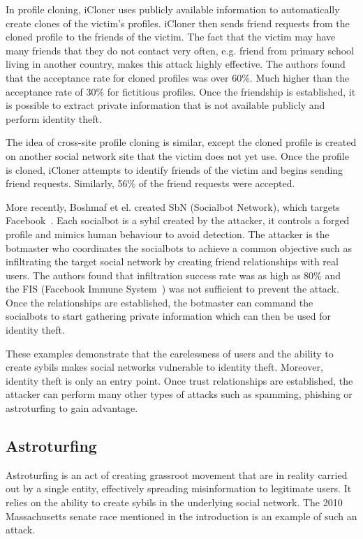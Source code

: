In profile cloning, iCloner uses publicly available information to automatically
create clones of the victim's profiles. iCloner then sends friend requests from
the cloned profile to the friends of the victim. The fact that the victim may
have many friends that they do not contact very often, e.g. friend from primary
school living in another country, makes this attack highly effective. The
authors found that the acceptance rate for cloned profiles was over 60\%. Much
higher than the acceptance rate of 30\% for fictitious profiles. Once the
friendship is established, it is possible to extract private information that is
not available publicly and perform identity theft.

The idea of cross-site profile cloning is similar, except the cloned profile is
created on another social network site that the victim does not yet use. Once
the profile is cloned, iCloner attempts to identify friends of the
victim and begins sending friend requests. Similarly, 56\% of the friend
requests were accepted. 

More recently, Boshmaf et el. created SbN (Socialbot Network), which targets
Facebook~\cite{boshmaf2011socialbot}. Each socialbot is a sybil created by the
attacker, it controls a forged profile and mimics human behaviour to avoid
detection. The attacker is the botmaster who coordinates the socialbots to
achieve a common objective such as infiltrating the target social network by creating
friend relationships with real users. The authors found that infiltration
success rate was as high as 80\% and the FIS (Facebook Immune
System~\cite{stein2011facebook}) was not sufficient to prevent the attack. Once
the relationships are established, the botmaster can command the socialbots to
start gathering private information which can then be used for identity theft.


These examples demonstrate that the carelessness of users and the ability to
create sybils makes social networks vulnerable to identity theft. Moreover,
identity theft is only an entry point. Once trust relationships are established,
the attacker can perform many other types of attacks such as spamming, phishing
or astroturfing to gain advantage.

\subsection{Astroturfing}
Astroturfing is an act of creating grassroot movement that are in reality
carried out by a single entity, effectively spreading misinformation to
legitimate users. It relies on the ability to create sybils in the underlying
social network. The 2010 Massachusetts senate race mentioned in the introduction
is an example of such an attack.

